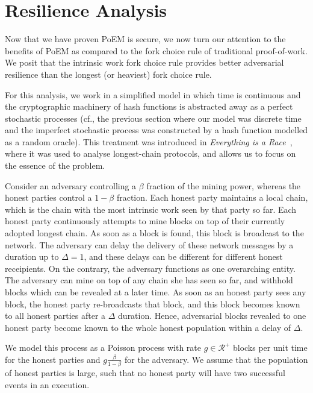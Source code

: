 \section{Resilience Analysis}

Now that we have proven PoEM is secure, we now turn our attention to the benefits of PoEM as compared to the
fork choice rule of traditional proof-of-work. We posit that the intrinsic work fork choice rule
provides better adversarial resilience than the longest (or heaviest) fork choice rule.

For this analysis, we work in a simplified model in which time is continuous
and the cryptographic machinery of hash functions is abstracted away as a perfect
stochastic processes (cf., the previous section where our model was discrete time
and the imperfect stochastic process was constructed by a hash function modelled as
a random oracle). This treatment was introduced in \emph{Everything is a Race}~\cite{eiar},
where it was used to analyse longest-chain protocols, and
allows us to focus on the essence of the problem.

Consider an adversary controlling a $\beta$ fraction of the mining power, whereas the
honest parties control a $1 - \beta$ fraction. Each honest party maintains a local chain,
which is the chain with the most intrinsic work seen by that party so far.
Each honest party continuously attempts to mine blocks on top of their currently
adopted longest chain. As soon as a block is found, this block is broadcast to the
network. The adversary can delay the delivery of these network messages by a duration
up to $\Delta = 1$, and these delays can be different for different honest receipients.
On the contrary, the adversary functions as one overarching entity.
The adversary can mine on top of any chain she has seen so far, and withhold blocks
which can be revealed at a later time. As soon as an honest party sees any
block, the honest party re-broadcasts that block, and this block becomes known to
all honest parties after a $\Delta$ duration. Hence, adversarial blocks revealed to one
honest party become known to the whole honest population within a delay of $\Delta$.

We model this process as a Poisson process with rate $g \in \mathcal{R}^+$ blocks per
unit time for the honest parties and $g \frac{\beta}{1 - \beta}$ for the adversary. We
assume that the population of honest parties is large, such that no honest party
will have two successful events in an execution.

